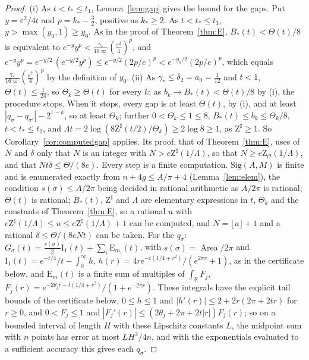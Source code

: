 \documentclass[pdflatex,sn-mathphys-num]{sn-jnl}
\theoremstyle{thmstyleone}%
\theoremstyle{thmstylethree}%
\newcommand{\Orb}{\mathcal{O}}
\newcommand{\Sig}{\mathrm{Sig}}
\newcommand{\Area}{\operatorname{Area}}
\newcommand{\R}{\mathbb{R}}
\newcommand{\cZ}{\mathrm{Z}}
\begin{document}
\begin{proof}
(i) As $t<t_*\le t_1$, Lemma~\ref{lem:gap} gives the bound for the gaps. Put $y=\varepsilon^2/4t$ and $p=k_*-\frac32$, positive as $k_*\ge2$. As $t<t_*\le t_3$, $y>\max(y_0,1)\ge y_0$. As in the proof of Theorem~\ref{thm:E}, $B_*(t)<\Theta(t)/8$ is equivalent to $e^{-y}y^p<\frac{\gamma_*}{16\varpi}(\frac{\varepsilon^2}4)^p$, and $e^{-y}y^p=e^{-y/2}\,(e^{-y/2}y^p)\le e^{-y/2}(2p/e)^p<e^{-y_0/2}(2p/e)^p$, which equals $\frac{\gamma_*}{16\varpi}(\frac{\varepsilon^2}4)^p$ by the definition of $y_0$.
(ii) As $\gamma_*\le\delta_2=a_0=\frac1{12}$ and $t<1$, $\Theta(t)\le\frac1{24}$, so $\Theta_k\ge\Theta(t)$ for every $k$; as $b_k\to B_*(t)<\Theta(t)/8$ by (i), the procedure stops. When it stops, every gap is at least $\Theta(t)$, by (i), and at least $|q_\sigma-q_{\sigma'}|-2^{1-k}$, so at least $\Theta_k$; further $0<\Theta_k\le1\le8$, $B_*(t)\le b_k\le\Theta_k/8$, $t<t_*\le t_2$, and $\Lambda t=2\log(8\cZ^\sharp(t/2)/\Theta_k)\ge2\log8\ge1$, as $\cZ^\sharp\ge1$. So Corollary~\ref{cor:computedgap} applies. Its proof, that of Theorem~\ref{thm:E}, uses of $N$ and $\delta$ only that $N$ is an integer with $N>e\cZ^\sharp(1/\Lambda)$, so that $N\ge e\cZ_\Orb(1/\Lambda)$, and that $Nt\delta\le\Theta/(8e)$.
Every step is a finite computation. $\Sig(A,M)$ is finite and is enumerated exactly from $n+4g\le A/\pi+4$ (Lemma~\ref{lem:elem}), the condition $s(\sigma)\le A/2\pi$ being decided in rational arithmetic as $A/2\pi$ is rational; $\Theta(t)$ is rational; $B_*(t)$, $\cZ^\sharp$ and $\Lambda$ are elementary expressions in $t$, $\Theta_k$ and the constants of Theorem~\ref{thm:E}, so a rational $u$ with $e\cZ^\sharp(1/\Lambda)\le u\le e\cZ^\sharp(1/\Lambda)+1$ can be computed, and $N=\lfloor u\rfloor+1$ and a rational $\delta\le\Theta/(8eNt)$ can be taken. For the $q_\sigma$: $G_\sigma(t)=\frac{s(\sigma)}2\mathrm I_1(t)+\sum_i\mathrm E_{m_i}(t)$, with $s(\sigma)=\Area/2\pi$ and $\mathrm I_1(t)=e^{-t/4}/t-\int_0^\infty h$, $h(r)=4re^{-t(1/4+r^2)}/(e^{2\pi r}+1)$, as in the certificate below, and $\mathrm E_m(t)$ is a finite sum of multiples of $\int_\R F_j$, $F_j(r)=e^{-2\theta_jr-t(1/4+r^2)}/(1+e^{-2\pi r})$. These integrals have the explicit tail bounds of the certificate below, $0\le h\le1$ and $|h'(r)|\le2+2r(2\pi+2tr)$ for $r\ge0$, and $0<F_j\le1$ and $|F_j'(r)|\le(2\theta_j+2\pi+2t|r|)F_j(r)$; so on a bounded interval of length $H$ with these Lipschitz constants $L$, the midpoint sum with $n$ points has error at most $LH^2/4n$, and with the exponentials evaluated to a sufficient accuracy this gives each $q_\sigma$.
\end{proof}
\end{document}
